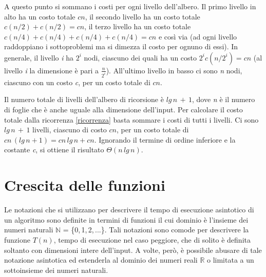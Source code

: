 \documentclass[10pt, a4paper]{report}
\begin{document}
A questo punto si sommano i costi per ogni livello dell'albero. Il primo livello in alto ha un costo totale $cn$, il secondo livello ha un costo totale $c(n/2) + c(n/2) = cn$, il terzo livello ha un costo totale $c(n/4) + c(n/4) + c(n/4) + c(n/4) = cn$ e così via (ad ogni livello raddoppiano i sottoproblemi ma si dimezza il costo per ognuno di essi). In generale, il livello \textit{i} ha $2^i$ nodi, ciascuno dei quali ha un costo $2^ic(n/2^i) = cn$ (al livello \textit{i} la dimensione è pari a $\frac{n}{2^i}$). All'ultimo livello in basso ci sono \textit{n} nodi, ciascuno con un costo \textit{c}, per un costo totale di $cn$.

Il numero totale di livelli dell'albero di ricorsione è $lg\,n \,+\, 1$, dove \textit{n} è il numero di foglie che è anche uguale alla dimensione dell'input. Per calcolare il costo totale dalla ricorrenza \eqref{ricorrenza} basta sommare i costi di tutti i livelli. Ci sono $lg\,n \,+\, 1$ livelli, ciascuno di costo $cn$, per un costo totale di $cn\,(lg\,n + 1) = cn\,lg\,n + cn$. Ignorando il termine di ordine inferiore e la costante \textit{c}, si ottiene il risultato $\Theta(n\,lg\,n)$.
\chapter{Crescita delle funzioni}
Le notazioni che si utilizzano per descrivere il tempo di esecuzione asintotico di un algoritmo sono definite in termini di funzioni il cui dominio è l'insieme dei numeri naturali $\mathbb{N}$ = \{0,\,1,\,2,\,...\}. Tali notazioni sono comode per descrivere la funzione $T(n)$, tempo di esecuzione nel caso peggiore, che di solito è definita soltanto con dimensioni intere dell'input. A volte, però, è possibile abusare di tale notazione asintotica ed estenderla al dominio dei numeri reali $\mathbb{R}$ o limitata a un sottoinsieme dei numeri naturali.
\end{document}
